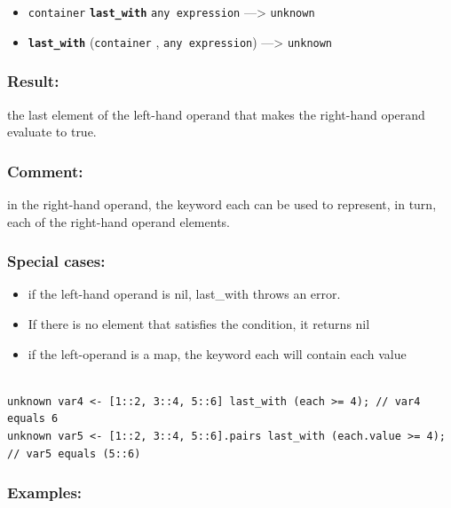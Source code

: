 \documentclass[]{book}
\providecommand{\tightlist}{%
  \setlength{\itemsep}{0pt}\setlength{\parskip}{0pt}}
\theoremstyle{definition}
\theoremstyle{definition}
\theoremstyle{definition}
\theoremstyle{remark}
\begin{document}
\begin{itemize}
\tightlist
\item
  \texttt{container} \textbf{\texttt{last\_with}}
  \texttt{any\ expression} ---\textgreater{} \texttt{unknown}
\item
  \textbf{\texttt{last\_with}} (\texttt{container} ,
  \texttt{any\ expression}) ---\textgreater{} \texttt{unknown}
\end{itemize}

\subsubsection{Result:}\label{result-308}

the last element of the left-hand operand that makes the right-hand
operand evaluate to true.

\subsubsection{Comment:}\label{comment-58}

in the right-hand operand, the keyword each can be used to represent, in
turn, each of the right-hand operand elements.

\subsubsection{Special cases:}\label{special-cases-86}

\begin{itemize}
\tightlist
\item
  if the left-hand operand is nil, last\_with throws an error.\\
\item
  If there is no element that satisfies the condition, it returns nil\\
\item
  if the left-operand is a map, the keyword each will contain each value
\end{itemize}

\begin{verbatim}
 
unknown var4 <- [1::2, 3::4, 5::6] last_with (each >= 4); // var4 equals 6 
unknown var5 <- [1::2, 3::4, 5::6].pairs last_with (each.value >= 4); // var5 equals (5::6)
\end{verbatim}

\subsubsection{Examples:}\label{examples-222}
\end{document}
